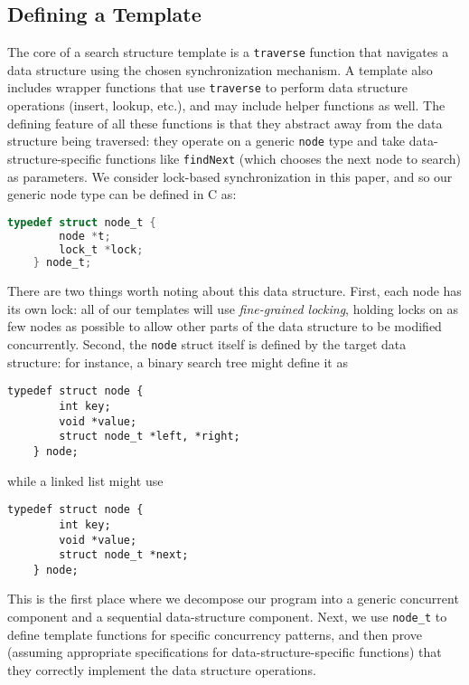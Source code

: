\documentclass[sigplan,screen]{acmart}
\begin{document}
{\subsection{Defining a Template}
\label{templates}

The core of a search structure template is a \lstinline{traverse} function that navigates a data structure using the chosen synchronization mechanism. A template also includes wrapper functions that use \lstinline{traverse} to perform data structure operations (insert, lookup, etc.), and may include helper functions as well. The defining feature of all these functions is that they abstract away from the data structure being traversed: they operate on a generic \lstinline{node} type and take data-structure-specific functions like \lstinline{findNext} (which chooses the next node to search) as parameters. We consider lock-based synchronization in this paper, and so our generic node type can be defined in C as:
\begin{lstlisting}[style=myStyle,language=C, backgroundcolor=\color{white}, basicstyle=\ttfamily\footnotesize, numbers=none, xleftmargin=0.5em]
	typedef struct node_t {
		node *t; 
		lock_t *lock;
	} node_t;
\end{lstlisting}
There are two things worth noting about this data structure. First, each node has its own lock: all of our templates will use \emph{fine-grained locking}, holding locks on as few nodes as possible to allow other parts of the data structure to be modified concurrently. Second, the \lstinline{node} struct itself is defined by the target data structure: for instance, a binary search tree might define it as 
\begin{lstlisting}[style=myStyle, numbers=none, xleftmargin=0.5em]
	typedef struct node {
		int key; 
		void *value; 
		struct node_t *left, *right;
	} node;
\end{lstlisting}
while a linked list might use
\begin{lstlisting}[style=myStyle, numbers=none, xleftmargin=0.5em]
	typedef struct node {
		int key; 
		void *value; 
		struct node_t *next;
	} node;
\end{lstlisting}
This is the first place where we decompose our program into a generic concurrent component and a sequential data-structure component. Next, we use \lstinline{node_t} to define template functions for specific concurrency patterns, and then prove (assuming appropriate specifications for data-structure-specific functions) that they correctly implement the data structure operations.

}
\end{document}
